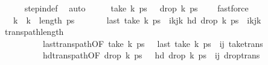 \begin{isabellebody}
\ \ \ \ \isamarkupfalse%
\ step{\isacharunderscore}{\kern0pt}in{\isacharunderscore}{\kern0pt}def\ \isamarkupfalse%
\ auto\isanewline
\ \ \isamarkupfalse%
\ \isamarkupfalse%
\ {\isachardoublequoteopen}take\ k\ ps\ {\isasymnoteq}\ {\isacharbrackleft}{\kern0pt}{\isacharbrackright}{\kern0pt}{\isachardoublequoteclose}\ {\isachardoublequoteopen}drop\ k\ ps\ {\isasymnoteq}\ {\isacharbrackleft}{\kern0pt}{\isacharbrackright}{\kern0pt}{\isachardoublequoteclose}\ \isamarkupfalse%
\ fastforce{\isacharplus}{\kern0pt}\isanewline
\ \ \isamarkupfalse%
\ \isamarkupfalse%
\ {\isachardoublequoteopen}{}\ {\isacharless}{\kern0pt}\ k\ {\isasymand}\ k\ {\isacharless}{\kern0pt}\ length\ {\isacharquery}{\kern0pt}ps{\isacharprime}{\kern0pt}{\isachardoublequoteclose}\ \isanewline
\ \ \ \ \ \ {\isachardoublequoteopen}last\ {\isacharparenleft}{\kern0pt}take\ k\ {\isacharquery}{\kern0pt}ps{\isacharprime}{\kern0pt}{\isacharparenright}{\kern0pt}\ {\isacharequal}{\kern0pt}\ {\isacharparenleft}{\kern0pt}i{\isacharplus}{\kern0pt}kj{\isacharplus}{\kern0pt}k\ {\isachardoublequoteopen}hd\ {\isacharparenleft}{\kern0pt}drop\ k\ {\isacharquery}{\kern0pt}ps{\isacharprime}{\kern0pt}{\isacharparenright}{\kern0pt}\ {\isacharequal}{\kern0pt}\ {\isacharparenleft}{\kern0pt}i{\isacharprime}{\kern0pt}{\isacharplus}{\kern0pt}kj{\isacharprime}{\kern0pt}{\isacharplus}{\kern0pt}k\isanewline
\ \ \ \ \isamarkupfalse%
\ trans{\isacharunderscore}{\kern0pt}path{\isacharunderscore}{\kern0pt}length\isanewline
\ \ \ \ \ \ \ \ \ \ last{\isacharunderscore}{\kern0pt}trans{\isacharunderscore}{\kern0pt}path{\isacharbrackleft}{\kern0pt}OF\ {\isacartoucheopen}take\ k\ ps\ {\isasymnoteq}\ {\isacharbrackleft}{\kern0pt}{\isacharbrackright}{\kern0pt}{\isacartoucheclose}\ {\isacartoucheopen}last\ {\isacharparenleft}{\kern0pt}take\ k\ ps{\isacharparenright}{\kern0pt}\ {\isacharequal}{\kern0pt}\ {\isacharparenleft}{\kern0pt}i{\isacharcomma}{\kern0pt}j{\isacharparenright}{\kern0pt}{\isacartoucheclose}{\isacharbrackright}{\kern0pt}\ take{\isacharunderscore}{\kern0pt}trans\ \isanewline
\ \ \ \ \ \ \ \ \ \ hd{\isacharunderscore}{\kern0pt}trans{\isacharunderscore}{\kern0pt}path{\isacharbrackleft}{\kern0pt}OF\ {\isacartoucheopen}drop\ k\ ps\ {\isasymnoteq}\ {\isacharbrackleft}{\kern0pt}{\isacharbrackright}{\kern0pt}{\isacartoucheclose}\ {\isacartoucheopen}hd\ {\isacharparenleft}{\kern0pt}drop\ k\ ps{\isacharparenright}{\kern0pt}\ {\isacharequal}{\kern0pt}\ {\isacharparenleft}{\kern0pt}i{\isacharprime}{\kern0pt}{\isacharcomma}{\kern0pt}j{\isacharprime}{\kern0pt}{\isacharparenright}{\kern0pt}{\isacartoucheclose}{\isacharbrackright}{\kern0pt}\ drop{\isacharunderscore}{\kern0pt}trans\isanewline

\end{isabellebody}
